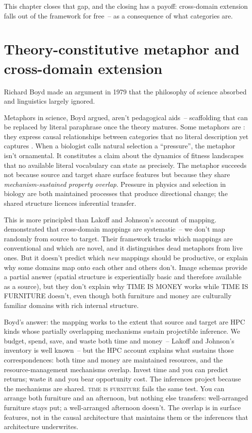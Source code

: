 This chapter closes that gap, and the closing has a payoff: cross-domain extension falls out of the framework for free~-- as a consequence of what categories are.

\section{Theory-constitutive metaphor and cross-domain extension}
\label{sec:17:tcm}

Richard Boyd made an argument in 1979 that the philosophy of science absorbed and linguistics largely ignored.

Metaphors in science, Boyd argued, aren't pedagogical aids~-- scaffolding that can be replaced by literal paraphrase once the theory matures. Some metaphors are : they express causal relationships between categories that no literal description yet captures \citep{boyd1979}. When a biologist calls natural selection a \enquote{pressure}, the metaphor isn't ornamental. It constitutes a claim about the dynamics of fitness landscapes that no available literal vocabulary can state as precisely. The metaphor succeeds not because source and target share surface features but because they share \emph{mechanism-sustained property overlap}. Pressure in physics and selection in biology are both maintained processes that produce directional change; the shared structure licences inferential transfer.

This is more principled than Lakoff and Johnson's account of mapping. \textcite{lakoff1980} demonstrated that cross-domain mappings are systematic~-- we don't map randomly from source to target. Their framework tracks which mappings are conventional and which are novel, and it distinguishes dead metaphors from live ones. But it doesn't predict which \emph{new} mappings should be productive, or explain why some domains map onto each other and others don't. Image schemas provide a partial answer (spatial structure is experientially basic and therefore available as a source), but they don't explain why TIME IS MONEY works while TIME IS FURNITURE doesn't, even though both furniture and money are culturally familiar domains with rich internal structure.

Boyd's answer: the mapping works to the extent that source and target are HPC kinds whose partially overlapping mechanisms sustain projectible inference. We budget, spend, save, and waste both time and money~-- Lakoff and Johnson's inventory is well known~-- but the HPC account explains what sustains those correspondences: both time and money are maintained resources, and the resource-management mechanisms overlap. Invest time and you can predict returns; waste it and you bear opportunity cost. The inferences project because the mechanisms are shared. \textsc{time is furniture} fails the same test. You can arrange both furniture and an afternoon, but nothing else transfers: well-arranged furniture stays put; a well-arranged afternoon doesn't. The overlap is in surface features, not in the causal architecture that maintains them or the inferences that architecture underwrites.

